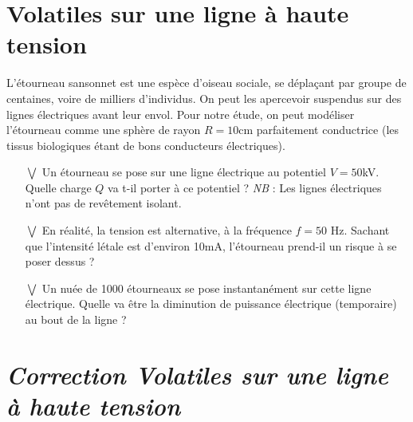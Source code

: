 \documentclass{report}
\begin{document}
\section*{Volatiles sur une ligne à haute tension}

L'étourneau sansonnet est une espèce d'oiseau sociale, se déplaçant par groupe de centaines, voire de milliers d'individus. On peut les apercevoir suspendus sur des lignes électriques avant leur envol. Pour notre étude, on peut modéliser l'étourneau comme une sphère de rayon $R=10$cm parfaitement conductrice (les tissus biologiques étant de bons conducteurs électriques). 

\begin{itemize}

	\item[$\bigvee$] Un étourneau se pose sur une ligne électrique au potentiel $V=50$kV. Quelle charge $Q$ va t-il porter à ce potentiel ? \textit{NB} : Les lignes électriques n'ont pas de revêtement isolant.
	
	\item[$\bigvee$] En réalité, la tension est alternative, à la fréquence $f=50$ Hz. Sachant que l'intensité létale est d'environ 10mA, l'étourneau prend-il un risque à se poser dessus ?
	
	\item[$\bigvee$] Un nuée de 1000 étourneaux se pose instantanément sur cette ligne électrique. Quelle va être la diminution de puissance électrique (temporaire) au bout de la ligne ?

\end{itemize} 

\newpage

\section*{\textit{Correction Volatiles sur une ligne à haute tension}}
\end{document}
